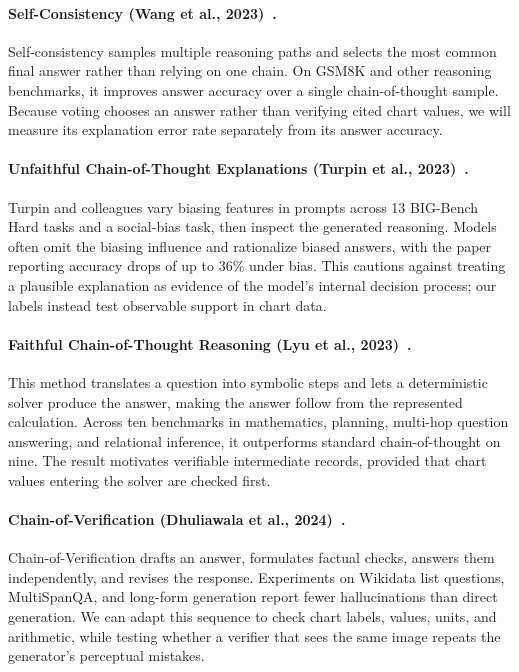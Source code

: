\paragraph{Self-Consistency (Wang et al., 2023)~\cite{wang2023selfconsistency}.} Self-consistency samples multiple reasoning paths and selects the most common final answer rather than relying on one chain. On GSM8K and other reasoning benchmarks, it improves answer accuracy over a single chain-of-thought sample. Because voting chooses an answer rather than verifying cited chart values, we will measure its explanation error rate separately from its answer accuracy.

\paragraph{Unfaithful Chain-of-Thought Explanations (Turpin et al., 2023)~\cite{turpin2023unfaithful}.} Turpin and colleagues vary biasing features in prompts across 13 BIG-Bench Hard tasks and a social-bias task, then inspect the generated reasoning. Models often omit the biasing influence and rationalize biased answers, with the paper reporting accuracy drops of up to 36\% under bias. This cautions against treating a plausible explanation as evidence of the model's internal decision process; our labels instead test observable support in chart data.

\paragraph{Faithful Chain-of-Thought Reasoning (Lyu et al., 2023)~\cite{lyu2023faithful}.} This method translates a question into symbolic steps and lets a deterministic solver produce the answer, making the answer follow from the represented calculation. Across ten benchmarks in mathematics, planning, multi-hop question answering, and relational inference, it outperforms standard chain-of-thought on nine. The result motivates verifiable intermediate records, provided that chart values entering the solver are checked first.

\paragraph{Chain-of-Verification (Dhuliawala et al., 2024)~\cite{dhuliawala2024cove}.} Chain-of-Verification drafts an answer, formulates factual checks, answers them independently, and revises the response. Experiments on Wikidata list questions, MultiSpanQA, and long-form generation report fewer hallucinations than direct generation. We can adapt this sequence to check chart labels, values, units, and arithmetic, while testing whether a verifier that sees the same image repeats the generator's perceptual mistakes.

